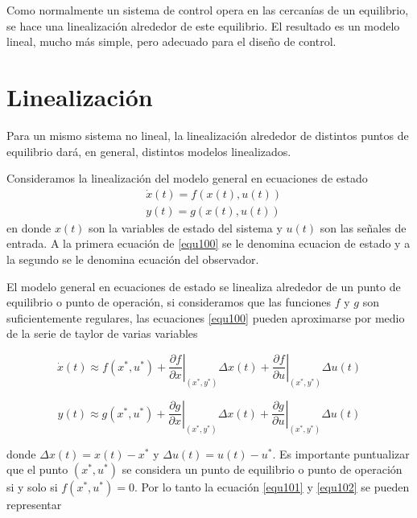 \documentclass[12pt]{book}
\theoremstyle{definition}
\theoremstyle{remark}
\theoremstyle{plain}
\begin{document}
Como normalmente un sistema de control opera en las cercanías de un equilibrio, se hace una linealización alrededor de este equilibrio. El resultado es un modelo lineal, mucho más simple, pero adecuado para el diseño de control.

\section{Linealización}

Para un mismo sistema no lineal, la linealización alrededor de distintos puntos de equilibrio dará, en general, distintos modelos linealizados.

Consideramos la linealización del modelo general en ecuaciones de estado
\begin{equation}
\label{equ100}
\begin{aligned}
& \dot{x}(t) = f (x(t), u(t)) \\
& y(t) = g( x(t), u(t) )
\end{aligned}
\end{equation}
en donde $x(t)$ son la variables de estado del sistema y $u(t)$ son las señales de entrada. A la primera ecuación de \ref{equ100} se le denomina ecuacion de estado y a la segundo se le denomina ecuación del observador.

El modelo general en ecuaciones de estado se linealiza alrededor de un punto de equilibrio o punto de operación, si consideramos que las funciones $f$ y $g$ son suficientemente regulares, las ecuaciones \ref{equ100} pueden aproximarse por medio de la serie de taylor de varias variables

\begin{equation}
\label{equ101}
\dot{x}(t) \approx f(x^*,u^*)+ \left . \frac{\partial f}{\partial x}  \right | _ {(x^*, y^*)}\Delta x(t) + \left . \frac{\partial f}{\partial u}  \right |   _ {(x^*, y^*)} \Delta u(t)
\end{equation}

\begin{equation}
\label{equ102}
y(t) \approx g(x^*,u^*)+ \left . \frac{\partial g}{\partial x}  \right | _ {(x^*, y^*)}\Delta x(t) + \left . \frac{\partial g}{\partial u}  \right |   _ {(x^*, y^*)} \Delta u(t)
\end{equation}

donde  $\Delta x(t) = x(t)- x^*$ y $\Delta u (t) = u(t) - u^*$. Es importante puntualizar que el punto $(x^*, u^*)$ se considera un punto de equilibrio o punto de operación si y solo si $f(x^*, u^*) =0$. Por lo tanto la ecuación \ref{equ101} y \ref{equ102} se pueden representar
\end{document}
